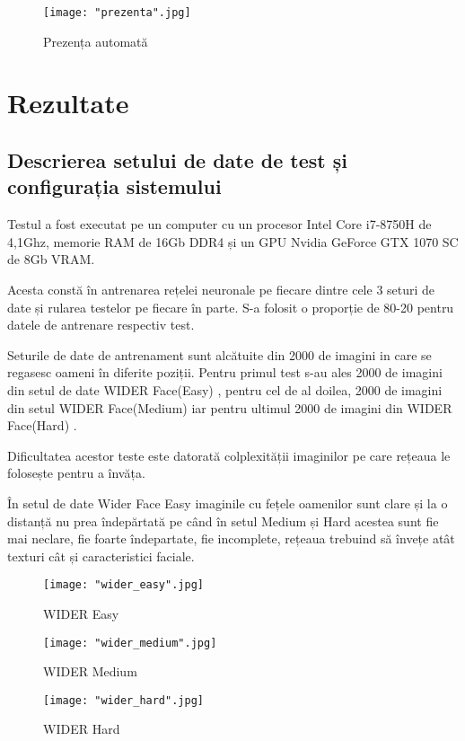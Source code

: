 \documentclass[a4paper, 12pt]{article}
\begin{document}
	\begin{figure}[H]
		\centering
		\texttt{[image: "prezenta".jpg]}
		\caption{Prezența automată}\label{fig::prezenta}
	\end{figure} 
	
	\section{Rezultate}
	
	\subsection{Descrierea setului de date de test și configurația sistemului}
	
	\quad\space Testul a fost executat pe un computer cu un procesor Intel Core i7-8750H de 4,1Ghz, memorie RAM de 16Gb DDR4 și un GPU Nvidia GeForce GTX 1070 SC de 8Gb VRAM. 
	
	Acesta constă în antrenarea rețelei neuronale pe fiecare dintre cele 3 seturi de date și rularea testelor pe fiecare în parte. S-a folosit o proporție de 80-20 pentru datele de antrenare respectiv test.
	
	Seturile de date de antrenament sunt alcătuite din 2000 de imagini in care se regasesc oameni în diferite poziții. Pentru primul test s-au ales 2000 de imagini din setul de date WIDER Face(Easy) \textbf{\cite{yang2016wider}}, pentru cel de al doilea, 2000 de imagini din setul WIDER Face(Medium) \textbf{\cite{yang2016wider}} iar pentru ultimul 2000 de imagini din WIDER Face(Hard) \textbf{\cite{yang2016wider}}.
	
	Dificultatea acestor teste este datorată colplexității imaginilor pe care rețeaua le folosește pentru a învăța. 
	
	În setul de date Wider Face Easy imaginile cu fețele oamenilor sunt clare și la o distanță nu prea îndepărtată pe când în setul Medium și Hard acestea sunt fie mai neclare, fie foarte îndepartate, fie incomplete, rețeaua trebuind să învețe atât texturi cât și caracteristici faciale. 
	
	
	\begin{figure}[!htb]
		\centering
		\begin{minipage}{0.33\textwidth}
			\centering
			\texttt{[image: "wider\_easy".jpg]}
			\caption{WIDER Easy}\label{fig:wider_easy}
		\end{minipage}
		\begin{minipage}{0.33\textwidth}
			\centering
			\texttt{[image: "wider\_medium".jpg]}
			\caption{WIDER Medium}\label{fig:wider_medium}
		\end{minipage}
		
		\begin{minipage}{0.33\textwidth}
			\centering
			\texttt{[image: "wider\_hard".jpg]}
			\caption{WIDER Hard}\label{fig:wider_hard}
		\end{minipage}
	\end{figure}
	
\end{document}
